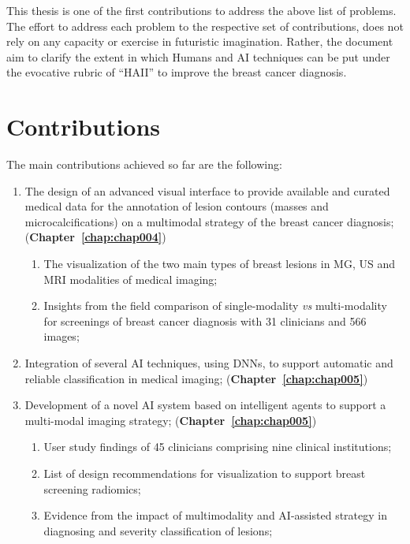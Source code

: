 This thesis is one of the first contributions to address the above list of problems.
The effort to address each problem to the respective set of contributions, does not rely on any capacity or exercise in futuristic imagination.
Rather, the document aim to clarify the extent in which Humans and \ac{AI} techniques can be put under the evocative rubric of ``\ac{HAII}'' to improve the breast cancer diagnosis.

\clearpage

\section{Contributions}
\label{sec:sec001003}

The main contributions achieved so far are the following:

\begin{enumerate}
\item The design of an advanced visual interface to provide available and curated medical data for the annotation of lesion contours (masses and microcalcifications) on a multimodal strategy of the breast cancer diagnosis; ({\bf Chapter~\ref{chap:chap004}})
\begin{enumerate}[label*=\arabic*.]
\item The visualization of the two main types of breast lesions in \ac{MG}, \ac{US} and \ac{MRI} modalities of medical imaging;
\item Insights from the field comparison of single-modality {\it vs} multi-modality for screenings of breast cancer diagnosis with 31 clinicians and 566 images;
\end{enumerate}
\item Integration of several \ac{AI} techniques, using \acp{DNN}, to support automatic and reliable classification in medical imaging; ({\bf Chapter~\ref{chap:chap005}})
\item Development of a novel \ac{AI} system based on intelligent agents to support a multi-modal imaging strategy; ({\bf Chapter~\ref{chap:chap005}})
\begin{enumerate}[label*=\arabic*.]
\item User study findings of 45 clinicians comprising nine clinical institutions;
\item List of design recommendations for visualization to support breast screening radiomics;
\item Evidence from the impact of multimodality and \ac{AI}-assisted strategy in diagnosing and severity classification of lesions;

\end{enumerate}
\end{enumerate}
